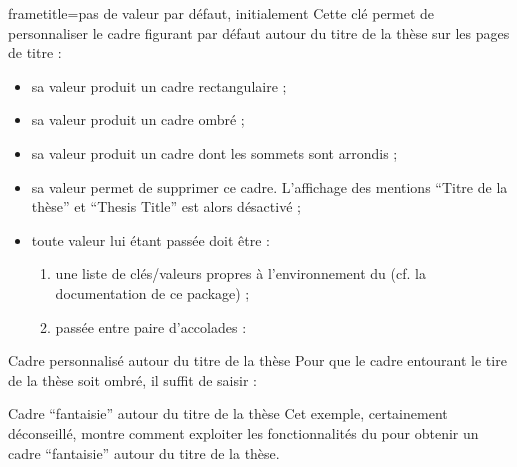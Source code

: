 {%
\begin{docKey}{frametitle}{=\textbar{}\textbar{}\textbar{}\textbar{}}{pas de valeur par défaut, initialement }
  Cette clé permet de personnaliser le cadre figurant par défaut autour du
  titre de la thèse sur les pages de titre :
  \begin{itemize}
  \item sa valeur  produit un cadre rectangulaire ;
  \item sa valeur  produit un cadre ombré ;
  \item sa valeur  produit un cadre dont les sommets sont
    arrondis ;
  \item sa valeur  permet de supprimer ce cadre. L'affichage des
    mentions \enquote{Titre de la thèse} et \foreignquote{english}{Thesis
      Title} est alors désactivé ;
  \item toute  valeur lui étant passée doit être :
    \begin{enumerate}
    \item une liste de clés/valeurs propres à l'environnement
       du  (cf. la
      documentation de ce package) ;
    \item passée entre paire d'accolades :
\begin{preamblecode}
\end{preamblecode}
    \end{enumerate}
  \end{itemize}
\end{docKey}
}

\begin{dbexample}{Cadre personnalisé autour du titre de la thèse}{}
  Pour que le cadre entourant le tire de la thèse soit ombré, il suffit de
  saisir :
\begin{preamblecode}
\end{preamblecode}
\end{dbexample}

\begin{dbexample}{Cadre \enquote{fantaisie} autour du titre de la thèse}{}
  Cet exemple, certainement déconseillé, montre comment exploiter les
  fonctionnalités du  pour obtenir un cadre
  \enquote{fantaisie} autour du titre de la thèse.%
  \NoAutoSpacing%
\begin{preamblecode}
\end{preamblecode}
\end{dbexample}

